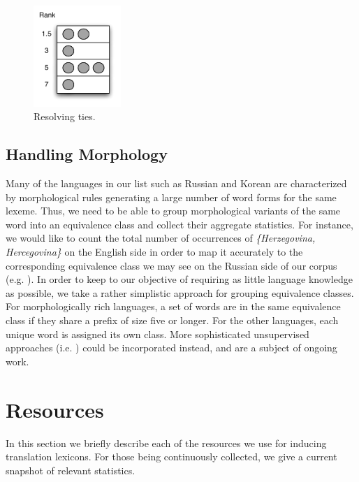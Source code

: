 \documentclass{article}
\begin{document}
\begin{figure}
\centerline{\mbox{\includegraphics[width=1.3in]{figures/rankties}}}
\caption{Resolving ties.}
\label{fig:rankties}
\end{figure}

\subsection{Handling Morphology} \label{sect:morph}

Many of the languages in our list such as Russian and Korean are characterized by morphological rules generating a large number of word forms for the same lexeme.  Thus, we need to be able to group morphological variants of the same word into an equivalence class and collect their aggregate statistics.  For instance, we would like to count the total number of occurrences of \emph{\{Herzegovina, Hercegovina\}} on the English side in order to map it accurately to the corresponding equivalence class we may see on the Russian side of our corpus (e.g. ).  In order to keep to our objective of requiring as little language knowledge as possible, we take a rather simplistic approach for grouping equivalence classes.  For morphologically rich languages, a set of words are in the same equivalence class if they share a prefix of size five or longer.  For the other languages, each unique word is assigned its own class.  More sophisticated unsupervised approaches (i.e. \cite{Goldwater:2006}) could be incorporated instead, and are a subject of ongoing work.

\section{Resources} \label{sect:resources}

In this section we briefly describe each of the resources we use for inducing translation lexicons.  For those being continuously collected, we give a current snapshot of relevant statistics.\\
\end{document}
